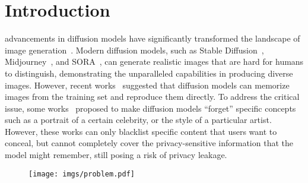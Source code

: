 \section{Introduction}
 advancements in diffusion models have significantly transformed the landscape of image generation~\cite{croitoru2023diffusion,zhan2023multimodal,zhu2024vision+}. Modern diffusion models, such as Stable Diffusion~\cite{rombach2022high}, Midjourney~\cite{midjourney2022}, and SORA~\cite{sora2024}, can generate realistic images that are hard for humans to distinguish, demonstrating the unparalleled capabilities in producing diverse images. However, recent works~\cite{carlini2023extracting,somepalli2024understanding,wen2023detecting} suggested that diffusion models can memorize images from the training set and reproduce them directly.  To address the critical issue, some works~\cite{zhang2023forget,ni2023degeneration,gandikota2024unified,kumari2023ablating} proposed to make diffusion models ``forget'' specific concepts such as a portrait of a certain celebrity, or the style of a particular artist. However, these works can only blacklist specific content that users want to conceal, but cannot completely cover the privacy-sensitive information that the model might remember, still posing a risk of privacy leakage.

\begin{figure}[tb]
  \centering
  \setlength{\abovecaptionskip}{7pt} %
  \setlength{\belowcaptionskip}{-7pt} %
  \texttt{[image: imgs/problem.pdf]}
  \caption{}
  \label{fig:problem}
\end{figure}
 
